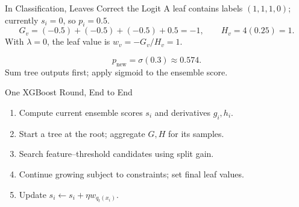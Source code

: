\begin{frame}{In Classification, Leaves Correct the Logit}
  A leaf contains labels $(1,1,1,0)$; currently $s_i=0$, so $p_i=0.5$.
  \pause
  \[
    G_v=(-0.5)+(-0.5)+(-0.5)+0.5=-1,\qquad H_v=4(0.25)=1.
  \]
  With $\lambda=0$, the leaf value is $w_v=-G_v/H_v=1$.
  \pause
  \vspace{.4cm}
  \centering
  \vspace{.3cm}
  \[p_{\mathrm{new}}=\sigma(0.3)\approx0.574.\]
  \centering Sum tree outputs first; apply sigmoid to the ensemble score.
\end{frame}

\begin{frame}{One XGBoost Round, End to End}
  \begin{enumerate}\setlength{\itemsep}{.32cm}
    \item Compute current ensemble scores $s_i$ and derivatives $g_i,h_i$.
    \item Start a tree at the root; aggregate $G,H$ for its samples.
    \pause
    \item Search feature--threshold candidates using split gain.
    \item Continue growing subject to constraints; set final leaf values.
    \pause
    \item Update $s_i\leftarrow s_i+\eta w_{q_t(x_i)}$.
  \end{enumerate}
  \vspace{.3cm}
  \centering
\end{frame}

